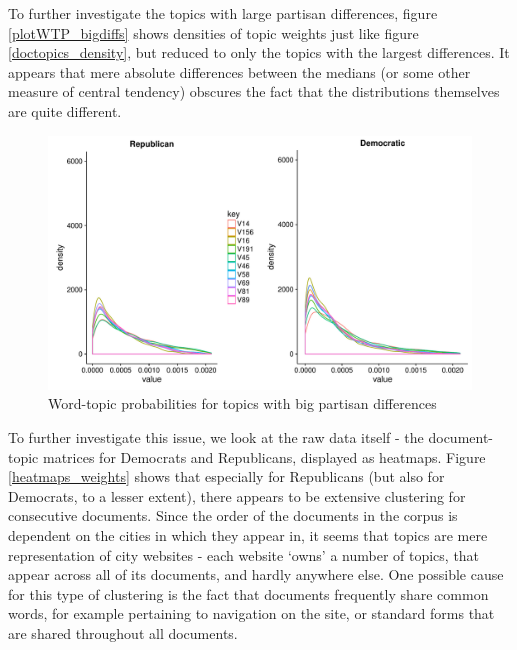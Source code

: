\documentclass[11pt]{article}
\begin{document}
To further investigate the topics with large partisan differences, figure \ref{plotWTP_bigdiffs} shows densities of topic weights just like figure \ref{doctopics_density}, but reduced to only the topics with the largest differences. It appears that mere absolute differences between the medians (or some other measure of central tendency) obscures the fact that the distributions themselves are quite different.

\begin{figure}[!ht]
	\centering %
	\caption{Word-topic probabilities for topics with big partisan differences}
	\label{doctopics_density_bigdiffs}
	\includegraphics[width=\linewidth]{figures/doctopics_density_bigdiffs_IN.pdf}
\end{figure}

To further investigate this issue, we look at the raw data itself - the document-topic matrices for Democrats and Republicans, displayed as heatmaps. Figure \ref{heatmaps_weights} shows that especially for Republicans (but also for Democrats, to a lesser extent), there appears to be extensive clustering for consecutive documents. Since the order of the documents in the corpus is dependent on the cities in which they appear in, it seems that topics are mere representation of city websites - each website `owns' a number of topics, that appear across all of its documents, and hardly anywhere else. One possible cause for this type of clustering is the fact that documents frequently share common words, for example pertaining to navigation on the site, or standard forms that are shared throughout all documents.
\end{document}
